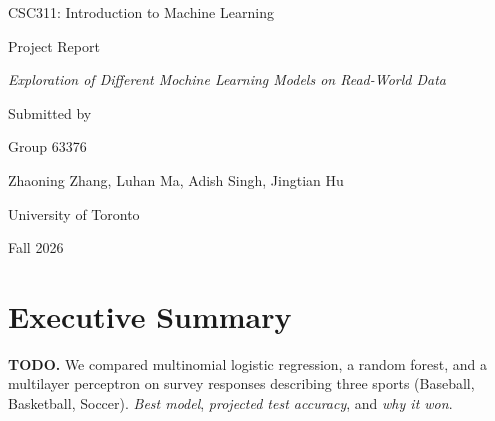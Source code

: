 \documentclass[11pt,letterpaper]{article}
\newcommand{\projecttitle}{Exploration of Different Mochine Learning Models on Read-World Data}
\newcommand{\groupnumber}{Group 63376}
\newcommand{\groupmembers}{Zhaoning Zhang, Luhan Ma, Adish Singh, Jingtian Hu}
\begin{document}
\begin{titlepage}
  \centering
  \vspace*{\fill}
  {\large CSC311: Introduction to Machine Learning\par}
  \vspace{2em}
  {\large Project Report\par}
  \vspace{1.5em}
  {\itshape \projecttitle\par}
  \vspace{6em}
  Submitted by\par
  \vspace{1em}
  \groupnumber\par
  \vspace{1em}
  {\large \groupmembers\par}
  \vspace{8em}
  University of Toronto\par
  Fall 2026\par
  \vspace*{\fill}
\end{titlepage}

\setcounter{page}{1}

\section{Executive Summary}\label{sec:summary}

\textbf{TODO.} We compared multinomial logistic regression, a random forest, and
a multilayer perceptron on survey responses describing three sports
(Baseball, Basketball, Soccer). \emph{Best model}, \emph{projected test accuracy},
and \emph{why it won}.

\end{document}
